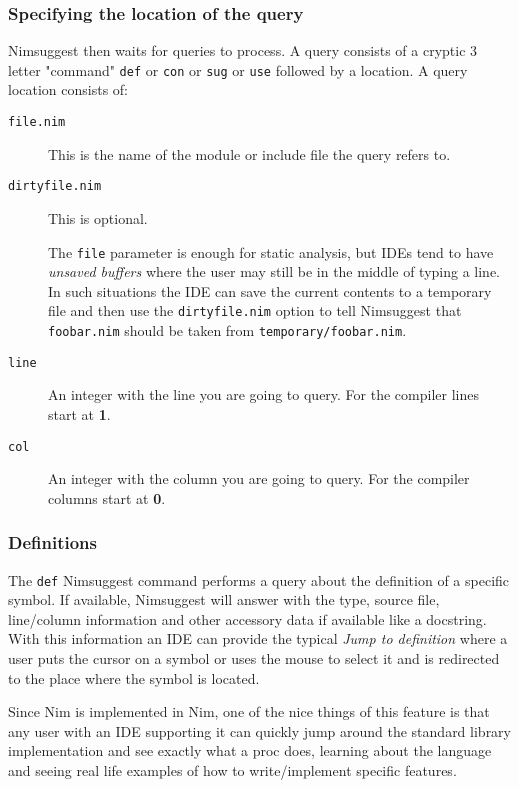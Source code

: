 \hypertarget{specifying-the-location-of-the-query}{%
\subsubsection{Specifying the location of the
query}\label{specifying-the-location-of-the-query}}

Nimsuggest then waits for queries to process. A query consists of a
cryptic 3 letter "command" \texttt{def} or \texttt{con} or \texttt{sug}
or \texttt{use} followed by a location. A query location consists of:

\begin{description}
\item[\texttt{file.nim}]
This is the name of the module or include file the query refers to.
\item[\texttt{dirtyfile.nim}]
This is optional.

The \texttt{file} parameter is enough for static analysis, but IDEs tend
to have \emph{unsaved buffers} where the user may still be in the middle
of typing a line. In such situations the IDE can save the current
contents to a temporary file and then use the \texttt{dirtyfile.nim}
option to tell Nimsuggest that \texttt{foobar.nim} should be taken from
\texttt{temporary/foobar.nim}.
\item[\texttt{line}]
An integer with the line you are going to query. For the compiler lines
start at \textbf{1}.
\item[\texttt{col}]
An integer with the column you are going to query. For the compiler
columns start at \textbf{0}.
\end{description}

\hypertarget{definitions}{%
\subsubsection{Definitions}\label{definitions}}

The \texttt{def} Nimsuggest command performs a query about the
definition of a specific symbol. If available, Nimsuggest will answer
with the type, source file, line/column information and other accessory
data if available like a docstring. With this information an IDE can
provide the typical \emph{Jump to definition} where a user puts the
cursor on a symbol or uses the mouse to select it and is redirected to
the place where the symbol is located.

Since Nim is implemented in Nim, one of the nice things of this feature
is that any user with an IDE supporting it can quickly jump around the
standard library implementation and see exactly what a proc does,
learning about the language and seeing real life examples of how to
write/implement specific features.

